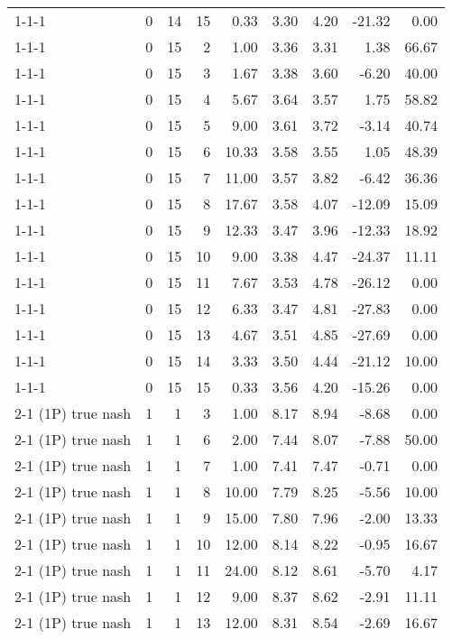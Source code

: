 \begin{tabular}{lrrrrrrrr}
1-1-1 & 0 & 14 & 15 & 0.33 & 3.30 & 4.20 & -21.32 & 0.00 \\
1-1-1 & 0 & 15 & 2 & 1.00 & 3.36 & 3.31 & 1.38 & 66.67 \\
1-1-1 & 0 & 15 & 3 & 1.67 & 3.38 & 3.60 & -6.20 & 40.00 \\
1-1-1 & 0 & 15 & 4 & 5.67 & 3.64 & 3.57 & 1.75 & 58.82 \\
1-1-1 & 0 & 15 & 5 & 9.00 & 3.61 & 3.72 & -3.14 & 40.74 \\
1-1-1 & 0 & 15 & 6 & 10.33 & 3.58 & 3.55 & 1.05 & 48.39 \\
1-1-1 & 0 & 15 & 7 & 11.00 & 3.57 & 3.82 & -6.42 & 36.36 \\
1-1-1 & 0 & 15 & 8 & 17.67 & 3.58 & 4.07 & -12.09 & 15.09 \\
1-1-1 & 0 & 15 & 9 & 12.33 & 3.47 & 3.96 & -12.33 & 18.92 \\
1-1-1 & 0 & 15 & 10 & 9.00 & 3.38 & 4.47 & -24.37 & 11.11 \\
1-1-1 & 0 & 15 & 11 & 7.67 & 3.53 & 4.78 & -26.12 & 0.00 \\
1-1-1 & 0 & 15 & 12 & 6.33 & 3.47 & 4.81 & -27.83 & 0.00 \\
1-1-1 & 0 & 15 & 13 & 4.67 & 3.51 & 4.85 & -27.69 & 0.00 \\
1-1-1 & 0 & 15 & 14 & 3.33 & 3.50 & 4.44 & -21.12 & 10.00 \\
1-1-1 & 0 & 15 & 15 & 0.33 & 3.56 & 4.20 & -15.26 & 0.00 \\
2-1 (1P) true nash & 1 & 1 & 3 & 1.00 & 8.17 & 8.94 & -8.68 & 0.00 \\
2-1 (1P) true nash & 1 & 1 & 6 & 2.00 & 7.44 & 8.07 & -7.88 & 50.00 \\
2-1 (1P) true nash & 1 & 1 & 7 & 1.00 & 7.41 & 7.47 & -0.71 & 0.00 \\
2-1 (1P) true nash & 1 & 1 & 8 & 10.00 & 7.79 & 8.25 & -5.56 & 10.00 \\
2-1 (1P) true nash & 1 & 1 & 9 & 15.00 & 7.80 & 7.96 & -2.00 & 13.33 \\
2-1 (1P) true nash & 1 & 1 & 10 & 12.00 & 8.14 & 8.22 & -0.95 & 16.67 \\
2-1 (1P) true nash & 1 & 1 & 11 & 24.00 & 8.12 & 8.61 & -5.70 & 4.17 \\
2-1 (1P) true nash & 1 & 1 & 12 & 9.00 & 8.37 & 8.62 & -2.91 & 11.11 \\
2-1 (1P) true nash & 1 & 1 & 13 & 12.00 & 8.31 & 8.54 & -2.69 & 16.67 \\
2-1 (1P) true nash & 1 & 1 & 14 & 12.00 & 8.38 & 8.81 & -4.91 & 16.67 \\

\end{tabular}
